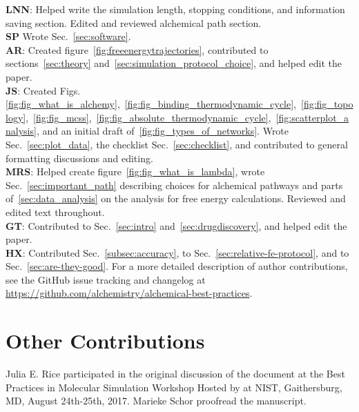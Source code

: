 \documentclass[9pt,bestpractices]{livecoms}
\newcommand{\githubrepository}{\url{https://github.com/alchemistry/alchemical-best-practices}} %
\begin{document}
\textbf{LNN}: Helped write the simulation length, stopping conditions, and information saving section. Edited and reviewed alchemical path section.\\
\textbf{SP} Wrote Sec.~\ref{sec:software}. \\
\textbf{AR}: Created figure~\ref{fig:freeenergytrajectories}, contributed to sections~\ref{sec:theory} and~\ref{sec:simulation_protocol_choice}, and helped edit the paper.\\
\textbf{JS}: Created Figs.~ \ref{fig:fig_what_is_alchemy},~\ref{fig:fig_binding_thermodynamic_cycle},~\ref{fig:fig_topology},~\ref{fig:fig_mcss},~\ref{fig:fig_absolute_thermodynamic_cycle},~\ref{fig:scatterplot_analysis}, and an initial draft of~\ref{fig:fig_types_of_networks}. Wrote Sec.~\ref{sec:plot_data}, the checklist Sec.~\ref{sec:checklist}, and contributed to general formatting discussions and editing.\\
\textbf{MRS}: Helped create figure~\ref{fig:fig_what_is_lambda}, wrote Sec.~\ref{sec:important_path} describing choices for alchemical pathways and parts of~\ref{sec:data_analysis} on the analysis for free energy calculations. Reviewed and edited text throughout.\\
\textbf{GT}: Contributed to Sec.~\ref{sec:intro} and~\ref{sec:drugdiscovery}, and helped edit the paper.\\
\textbf{HX}: Contributed Sec.~\ref{subsec:accuracy}, to Sec.~\ref{sec:relative-fe-protocol}, and to Sec.~\ref{sec:are-they-good}.
For a more detailed description of author contributions,
see the GitHub issue tracking and changelog at \githubrepository.

\section*{Other Contributions}
%
Julia E. Rice participated in the original discussion of the document at the Best Practices in Molecular Simulation Workshop Hosted by at NIST, Gaithersburg, MD, August 24th-25th, 2017.
Marieke Schor proofread the manuscript. 
\end{document}
